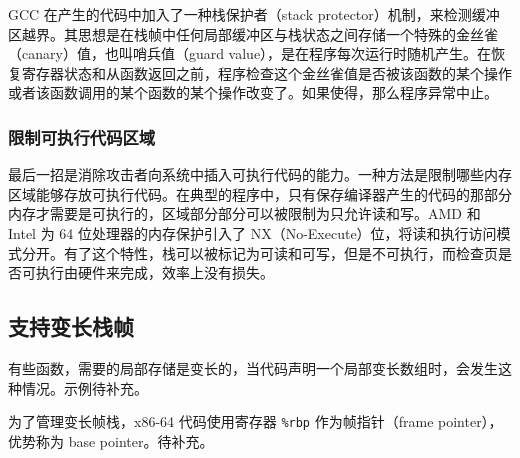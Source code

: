 GCC 在产生的代码中加入了一种栈保护者（stack protector）机制，来检测缓冲区越界。其思想是在栈帧中任何局部缓冲区与栈状态之间存储一个特殊的金丝雀（canary）值，也叫哨兵值（guard value），是在程序每次运行时随机产生。在恢复寄存器状态和从函数返回之前，程序检查这个金丝雀值是否被该函数的某个操作或者该函数调用的某个函数的某个操作改变了。如果使得，那么程序异常中止。

\subsubsection{限制可执行代码区域}

最后一招是消除攻击者向系统中插入可执行代码的能力。一种方法是限制哪些内存区域能够存放可执行代码。在典型的程序中，只有保存编译器产生的代码的那部分内存才需要是可执行的，区域部分部分可以被限制为只允许读和写。AMD 和 Intel 为 64 位处理器的内存保护引入了 NX（No-Execute）位，将读和执行访问模式分开。有了这个特性，栈可以被标记为可读和可写，但是不可执行，而检查页是否可执行由硬件来完成，效率上没有损失。

\subsection{支持变长栈帧}

有些函数，需要的局部存储是变长的，当代码声明一个局部变长数组时，会发生这种情况。示例待补充。

为了管理变长帧栈，x86-64 代码使用寄存器 \verb|%rbp| 作为帧指针（frame pointer），优势称为 base pointer。待补充。

\endinput
